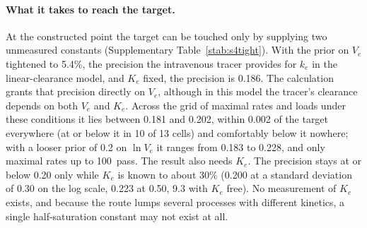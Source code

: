 \paragraph{What it takes to reach the target.} At the constructed point the target can be
touched only by supplying two unmeasured constants (Supplementary Table~\ref{stab:s4tight}).
With the prior on $V_e$ tightened to 5.4\%, the precision the intravenous tracer provides for
$k_e$ in the linear-clearance model, and $K_e$ fixed, the precision is 0.186. The calculation
grants that precision directly on $V_e$, although in this model the tracer's clearance depends on
both $V_e$ and $K_e$. Across the grid of maximal rates and loads under these conditions it lies
between 0.181 and 0.202, within 0.002 of the target everywhere (at or below it in 10 of 13
cells) and comfortably below it nowhere; with a looser prior of 0.2 on $\ln V_e$ it ranges from
0.183 to 0.228, and only maximal rates up to 100\um\ pass. The
result also needs $K_e$. The precision stays at or below 0.20 only while $K_e$ is known to about
30\% (0.200 at a standard deviation of 0.30 on the log scale, 0.223 at 0.50, 9.3 with $K_e$
free). No measurement of $K_e$ exists, and because the route lumps several processes with
different kinetics, a single half-saturation constant may not exist at all.


